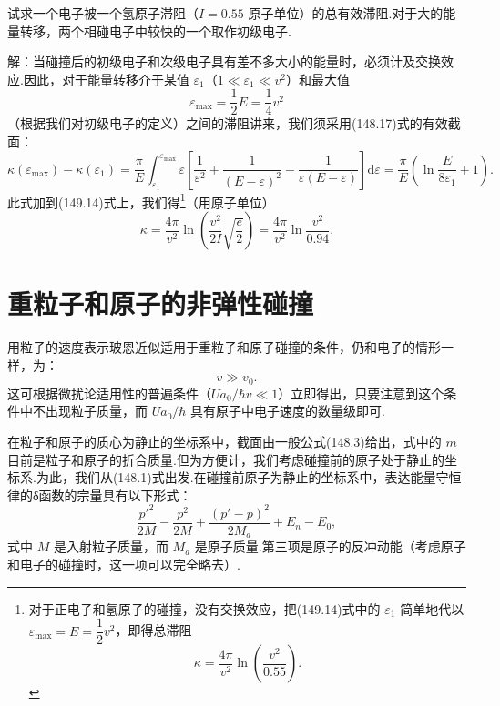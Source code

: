 \begin{xiti}

\quad 试求一个电子被一个氢原子滞阻（$I=0.55$ 原子单位）的总有效滞阻.对于大的能量转移，两个相碰电子中较快的一个取作初级电子.

解：当碰撞后的初级电子和次级电子具有差不多大小的能量时，必须计及交换效应.因此，对于能量转移介于某值 $\varepsilon_1$（$1\ll\varepsilon_1\ll v^2$）和最大值
\begin{equation*}
  \varepsilon_{\mathrm{max}}=\frac{1}{2}E=\frac{1}{4}v^2
\end{equation*}
（根据我们对初级电子的定义）之间的滞阻讲来，我们须采用(148.17)式的有效截面：
\begin{equation*}
  \kappa\left(\varepsilon_{\mathrm{max}}\right)-\kappa\left(\varepsilon_1\right)
  =\frac{\pi}{E}\int_{\varepsilon_1}^{\varepsilon_{\mathrm{max}}}\varepsilon
  \left[\frac{1}{\varepsilon^2}+\frac{1}{(E-\varepsilon)^2}
  -\frac{1}{\varepsilon(E-\varepsilon)}\right]\mathrm{d}\varepsilon
  =\frac{\pi}{E}\left(\ln\frac{E}{8\varepsilon_1}+1\right).
\end{equation*}
此式加到(149.14)式上，我们得\footnote{对于正电子和氢原子的碰撞，没有交换效应，把(149.14)式中的 $\varepsilon_1$ 简单地代以 $\varepsilon_{\max}=E=\dfrac{1}{2}v^2$，即得总滞阻
\begin{equation*}
  \kappa=\frac{4\pi}{v^2}\ln\left(\frac{v^2}{0.55}\right).
\end{equation*}}（用原子单位）
\begin{equation*}
  \kappa=\frac{4\pi}{v^2}\ln\left(\frac{v^2}{2I}\sqrt{\frac{e}{2}}\right)
  =\frac{4\pi}{v^2}\ln\frac{v^2}{0.94}.
\end{equation*}

\end{xiti}

\section{重粒子和原子的非弹性碰撞}

用粒子的速度表示玻恩近似适用于重粒子和原子碰撞的条件，仍和电子的情形一样，为：
\begin{equation*}
  v\gg v_0.
\end{equation*}
这可根据微扰论适用性的普遍条件（$Ua_0/\hbar v\ll1$）立即得出，只要注意到这个条件中不出现粒子质量，而 $Ua_0/\hbar$ 具有原子中电子速度的数量级即可.

在粒子和原子的质心为静止的坐标系中，截面由一般公式(148.3)给出，式中的 $m$ 目前是粒子和原子的折合质量.但为方便计，我们考虑碰撞前的原子处于静止的坐标系.为此，我们从(148.1)式出发.在碰撞前原子为静止的坐标系中，表达能量守恒律的δ函数的宗量具有以下形式：
\begin{equation}
  \frac{p'^2}{2M}-\frac{p^2}{2M}+\frac{(p'-p)^2}{2M_a}+E_n-E_0,
\end{equation}
式中 $M$ 是入射粒子质量，而 $M_a$ 是原子质量.第三项是原子的反冲动能（考虑原子和电子的碰撞时，这一项可以完全略去）.

